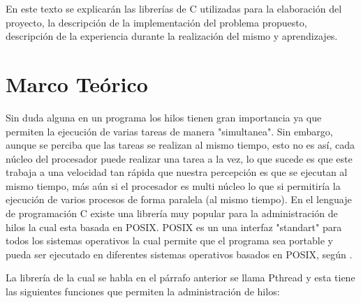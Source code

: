 \documentclass[16pt,a4papper]{article}
\begin{document}
	En este texto se explicarán las librerías de C utilizadas para la elaboración del proyecto, la descripción de la implementación del problema propuesto, descripción de la experiencia durante la realización del mismo y aprendizajes.\par
	
	\newpage
	\section{Marco Teórico}
	Sin duda alguna en un programa los hilos tienen gran importancia ya que permiten la ejecución de varias tareas de manera "simultanea". Sin embargo, aunque se perciba que las tareas se realizan al mismo tiempo, esto no es así, cada núcleo del procesador puede realizar una tarea a la vez, lo que sucede es que este trabaja a una velocidad tan rápida que nuestra percepción es que se ejecutan al mismo tiempo, más aún si el procesador es multi núcleo lo que si permitiría la ejecución de varios procesos de forma paralela (al mismo tiempo). En el lenguaje de programación C existe una librería muy popular para la administración de hilos la cual esta basada en POSIX. POSIX es un una interfaz "standart" para todos los sistemas operativos la cual permite que el programa sea portable y pueda ser ejecutado en diferentes sistemas operativos basados en POSIX, según \cite{POSIX_documentation}.\par 
	
	La librería de la cual se habla en el párrafo anterior se llama Pthread y esta tiene las siguientes funciones que permiten la administración de hilos:\par
	
\end{document}
